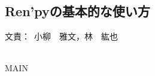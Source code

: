 \documentclass[a4paper]{jarticle}
\newcommand{\resp}[1]{\begin{flushright}文責：~#1\end{flushright}~\\}
\begin{document}
\fi

\subsection{Ren'pyの基本的な使い方}
  \resp{小柳　雅文，林　紘也}


\expandafter\ifx\csname MAIN \endcsname\relax
  
\end{document}
